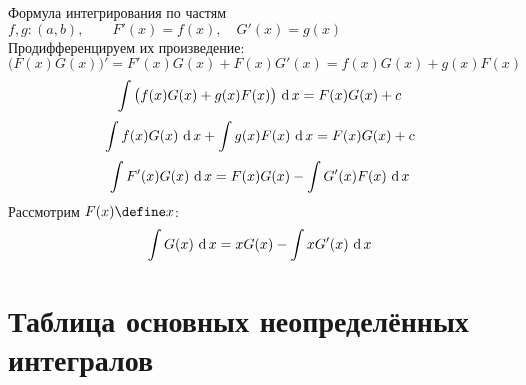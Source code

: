 \begin{undefthm}{Формула интегрирования по частям}
    $ f, g : (a, b), \qquad F'(x) = f(x), \quad G'(x) = g(x) $ \\
    Продифференцируем их произведение:
    $$ \big( F(x) G(x) \big)' = F'(x)G(x) + F(x)G'(x) = f(x)G(x) + g(x)F(x) $$
    $$ \int { \big( f(x)G(x) + g(x)F(x) \big) } \, \operatorname{d} {x} = F(x)G(x) + c $$
    $$ \int {f(x)G(x)} \, \operatorname{d} {x} + \int {g(x)F(x)} \, \operatorname{d} {x} = F(x)G(x) + c $$
    $$ \int {F'(x)G(x)} \, \operatorname{d} {x} = F(x)G(x) - \int {G'(x)F(x)} \, \operatorname{d} {x} $$
    Рассмотрим $ F(x) \define x $:
    $$ \int {G(x)} \, \operatorname{d} {x} = xG(x) - \int {xG'(x)} \, \operatorname{d} {x} $$
\end{undefthm}

\section{Таблица основных неопределённых интегралов}

